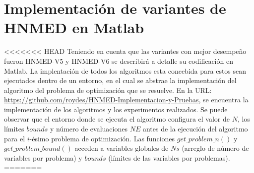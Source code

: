 
\chapter{Implementación de variantes de HNMED en Matlab} %

\label{AppendixA} %

<<<<<<< HEAD
Teniendo en cuenta que las variantes con mejor desempeño fueron HNMED-V5 y HNMED-V6 se describirá a detalle su codificación en Matlab. La implentación de todos los algoritmos esta concebida para estos sean ejecutados dentro de un entorno, en el cual se abstrae la implementación del algoritmo del problema de optimización que se resuelve. En la URL:  \url{https://github.com/roydes/HNMED-Implementacion-y-Pruebas}, se encuentra la implementación de los algoritmos y los experimentos realizados. Se puede observar que el entorno donde se ejecuta el algoritmo configura el valor de $N$, los límites $bounds$ y número de evaluaciones $NE$ antes de la ejecución del algoritmo para el $i$-ésimo problema de optimización. Las funciones $get\_problem\_n()$ y $get\_problem\_bound()$ acceden a variables globales  de $Ns$ (arreglo de número de variables por problema) y $bounds$ (límites de las variables por problemas).
=======

